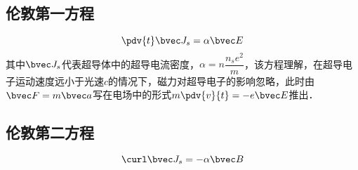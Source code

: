 \subsection{伦敦第一方程}
\begin{equation}
\pdv{t}\bvec J_s=\alpha\bvec E
\end{equation}
其中$\bvec J_s$代表超导体中的超导电流密度，$\alpha=n\dfrac {n_se^2}m$，该方程理解，在超导电子运动速度远小于光速$c$的情况下，磁力对超导电子的影响忽略，此时由$\bvec F=m \bvec a$写在电场中的形式$m\pdv{v}{t}=-e\bvec E$推出．
\subsection{伦敦第二方程}
\begin{equation}
\curl\bvec J_s=-\alpha\bvec B
\end{equation}
